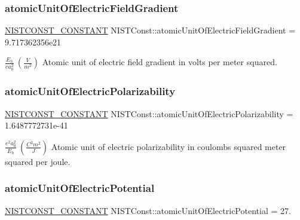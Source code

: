 \subsubsection{\texorpdfstring{atomic\+Unit\+Of\+Electric\+Field\+Gradient}{atomicUnitOfElectricFieldGradient}}
{\footnotesize\ttfamily \mbox{\hyperlink{_n_i_s_t_const_8hpp_a2b0fc1d7452373f816175dd86ce26729}{N\+I\+S\+T\+C\+O\+N\+S\+T\+\_\+\+C\+O\+N\+S\+T\+A\+NT}} N\+I\+S\+T\+Const\+::atomic\+Unit\+Of\+Electric\+Field\+Gradient = 9.\+717362356e21}

$\frac{E_h}{e a_0^2}\ (\frac{V}{m^2})$ Atomic unit of electric field gradient in volts per meter squared. \mbox{\label{group___n_i_s_t_const-_atomic_unit_ga635fe4831055d2787293d19a8134c0c7}} 
\subsubsection{\texorpdfstring{atomic\+Unit\+Of\+Electric\+Polarizability}{atomicUnitOfElectricPolarizability}}
{\footnotesize\ttfamily \mbox{\hyperlink{_n_i_s_t_const_8hpp_a2b0fc1d7452373f816175dd86ce26729}{N\+I\+S\+T\+C\+O\+N\+S\+T\+\_\+\+C\+O\+N\+S\+T\+A\+NT}} N\+I\+S\+T\+Const\+::atomic\+Unit\+Of\+Electric\+Polarizability = 1.\+6487772731e-\/41}

$\frac{e^2 a_0^2}{E_h} \ (\frac{C^2 m^2}{J})$ Atomic unit of electric polarizability in coulombs squared meter squared per joule. \mbox{\label{group___n_i_s_t_const-_atomic_unit_gaabb37ce172d4f7c491b79ac27db120da}} 
\subsubsection{\texorpdfstring{atomic\+Unit\+Of\+Electric\+Potential}{atomicUnitOfElectricPotential}}
{\footnotesize\ttfamily \mbox{\hyperlink{_n_i_s_t_const_8hpp_a2b0fc1d7452373f816175dd86ce26729}{N\+I\+S\+T\+C\+O\+N\+S\+T\+\_\+\+C\+O\+N\+S\+T\+A\+NT}} N\+I\+S\+T\+Const\+::atomic\+Unit\+Of\+Electric\+Potential = 27.}

